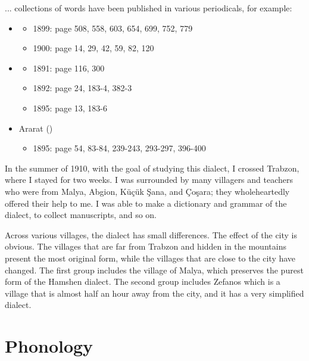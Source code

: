 \begin{adjarianpage}\label{page:185}\end{adjarianpage}%

... collections of words have been published in various periodicals, for example:

\begin{itemize}
	\item {}
	\begin{itemize}
		\item 1899: page 508, 558, 603, 654, 699, 752, 779
		\item1900: page 14, 29, 42, 59, 82, 120
	\end{itemize}
	\item {}
	\begin{itemize}
		\item 1891: page 116, 300
		\item 1892: page 24, 183-4, 382-3
		\item 1895: page 13, 183-6
		
	\end{itemize}
	\item Ararat ()
	\begin{itemize}
		\item 1895: page 54, 83-84, 239-243, 293-297, 396-400
	\end{itemize}
\end{itemize}

In the summer of 1910, with the goal of studying this dialect, I crossed Trabzon, where I stayed for two weeks. I was surrounded by many villagers and teachers who were from Malya, Abgion, Küçük Şana, and Çoşara; they wholeheartedly offered their help to me. I was able to make a dictionary and grammar of the dialect, to collect manuscripts, and so on. 

Across various villages, the dialect has small differences. The effect of the city is obvious. The villages that are far from Trabzon and hidden in the mountains present the most original form, while the villages that are close to the city have changed. The first group includes the village of Malya, which preserves the purest form of the Hamshen dialect. The second group includes Zefanos which is a village that is almost half an hour away from the city, and it has a very simplified dialect. 

\section{Phonology}


